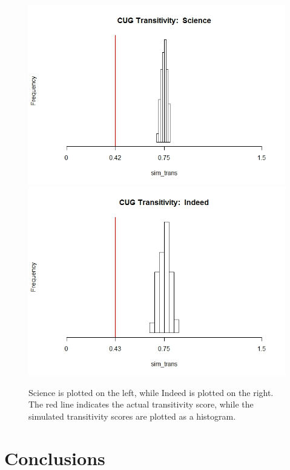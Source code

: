 \documentclass[12pt]{article}
\begin{document}
\vspace{2mm}
\begin{figure}[H]
	\centering
	\includegraphics[scale=0.3]{Images/cug_trans_sci.jpeg}
	\includegraphics[scale=0.3]{Images/cug_trans_ind.jpeg}
	\caption{Science is plotted on the left, while Indeed is plotted on the right. The red line indicates the actual transitivity score, while the simulated transitivity scores are plotted as a histogram.}
\end{figure}
\vspace{2mm} 
 
\section{Conclusions}
\end{document}
